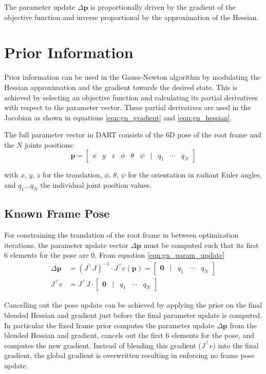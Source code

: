 The parameter update $\Delta\mathbf{p}$ is proportionally driven by the gradient of the objective function and inverse proportional by the approximation of the Hessian.


\section{Prior Information}

Prior information can be used in the Gauss-Newton algorithm by modulating the Hessian approximation and the gradient towards the desired state. This is achieved by selecting an objective function and calculating its partial derivatives with respect to the parameter vector. These partial derivatives are used in the Jacobian as shown in equations \ref{eqn:gn_gradient} and \ref{eqn:gn_hessian}.

The full parameter vector in DART consists of the 6D pose of the root frame and the $N$ joints positions:
\begin{equation}
\mathbf{p} = \begin{bmatrix}
x & y & z & \phi & \theta & \psi & | & q_1 & \cdots & q_N
\end{bmatrix}
\end{equation}

with $x$, $y$, $z$ for the translation, $\phi$, $\theta$, $\psi$ for the orientation in radiant Euler angles, and $q_1 \dots q_N$ the individual joint position values.


\subsection{Known Frame Pose}

For constraining the translation of the root frame in between optimization iterations, the parameter update vector $\Delta\mathbf{p}$ must be computed such that its first 6 elements for the pose are $0$. From equation \ref{eqn:gn_param_update}
\begin{align}
\Delta\mathbf{p} &= \left(J^\top J\right)^{-1} \cdot J^\top e(\mathbf{p}) = \begin{bmatrix}
\mathbf{0} & | & q_1 & \cdots & q_N
\end{bmatrix} \\
J^\top e &= J^\top J \cdot \begin{bmatrix}
\mathbf{0} & | & q_1 & \cdots & q_N
\end{bmatrix}
\end{align}

Cancelling out the pose update can be achieved by applying the prior on the final blended Hessian and gradient just before the final parameter update is computed. In particular the fixed frame prior computes the parameter update $\Delta\mathbf{p}$ from the blended Hessian and gradient, cancels out the first 6 elements for the pose, and computes the new gradient. Instead of blending this gradient ($J^\top e$) into the final gradient, the global gradient is overwritten resulting in enforcing no frame pose update.


